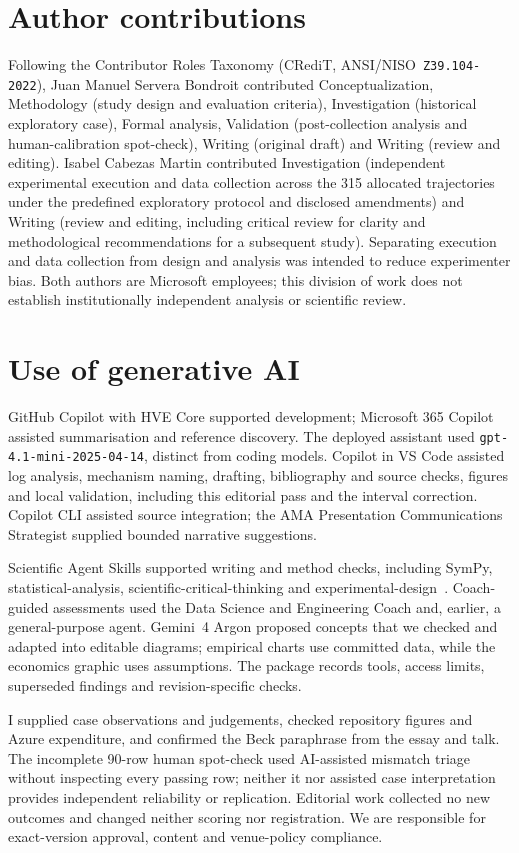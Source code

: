 \documentclass[11pt,a4paper]{article}
\begin{document}
\section*{Author contributions}
Following the Contributor Roles Taxonomy (CRediT, ANSI/NISO~\nolinkurl{Z39.104-2022}),
Juan Manuel Servera Bondroit contributed Conceptualization, Methodology
(study design and evaluation criteria), Investigation (historical exploratory
case), Formal analysis, Validation (post-collection analysis and
human-calibration spot-check), Writing (original draft) and Writing (review
and editing). Isabel Cabezas Martin contributed Investigation (independent
experimental execution and data collection across the 315 allocated
trajectories under the predefined exploratory protocol and disclosed
amendments) and Writing (review and editing, including critical review for
clarity and methodological recommendations for a subsequent study).
Separating execution and data collection from design and analysis was intended
to reduce experimenter bias. Both authors are Microsoft employees; this
division of work does not establish institutionally independent analysis
or scientific review.

\section*{Use of generative AI}
GitHub Copilot with HVE Core supported development; Microsoft 365
Copilot assisted summarisation and reference discovery. The deployed
assistant used \texttt{gpt-4.1-mini-2025-04-14}, distinct from coding models.
Copilot in VS Code assisted log analysis, mechanism naming, drafting,
bibliography and source checks, figures and local validation, including
this editorial pass and the interval correction. Copilot CLI
assisted source integration; the AMA Presentation Communications Strategist
supplied bounded narrative suggestions.

Scientific Agent Skills supported writing and method checks, including
SymPy, statistical-analysis, scientific-critical-thinking and
experimental-design~\cite{kassis2026skills}. Coach-guided assessments used
the Data Science and Engineering Coach and, earlier, a general-purpose
agent. Gemini~4 Argon proposed concepts that we checked and adapted
into editable diagrams; empirical charts use committed data, while the
economics graphic uses assumptions. The package records tools,
access limits, superseded findings and revision-specific checks.

I supplied case observations and judgements, checked repository figures and
Azure expenditure, and confirmed the Beck paraphrase from the essay and talk.
The incomplete 90-row human spot-check used AI-assisted mismatch triage
without inspecting every passing row; neither it nor assisted case
interpretation provides independent reliability or replication. Editorial
work collected no new outcomes and changed neither scoring nor registration.
We are responsible for exact-version approval, content and venue-policy compliance.
\end{document}
